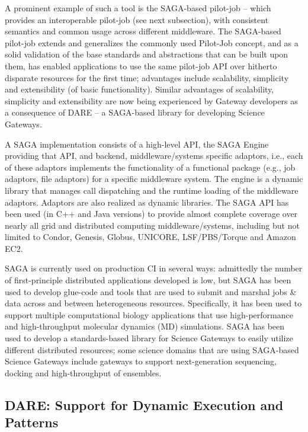 \documentclass[]{svjour3}
\begin{document}
A prominent example of such a tool is the SAGA-based pilot-job – which
provides an interoperable pilot-job (see next subsection), with
consistent semantics and common usage across different middleware. The
SAGA-based pilot-job extends and generalizes the commonly used
Pilot-Job concept, and as a solid validation of the base standards and
abstractions that can be built upon them, has enabled applications to
use the same pilot-job API over hitherto disparate resources for the
first time; advantages include scalability, simplicity and
extensibility (of basic functionality). Similar advantages of
scalability, simplicity and extensibility are now being experienced by
Gateway developers as a consequence of DARE – a SAGA-based library for
developing Science Gateways.

A SAGA implementation consists of a high-level API, the SAGA
Engine providing that API, and backend, middleware/systems specific
adaptors, i.e., each of these adaptors implements the functionality of
a functional package (e.g., job adaptors, file adaptors) for a
specific middleware system. The engine is a dynamic library that
manages call dispatching and the runtime loading of the middleware
adaptors. Adaptors are also realized as dynamic libraries. The SAGA
API has been used (in C++ and Java versions) to provide almost
complete coverage over nearly all grid and distributed computing
middleware/systems, including but not limited to Condor, Genesis,
Globus, UNICORE, LSF/PBS/Torque and Amazon EC2.

SAGA is currently used on production CI in several ways: admittedly
the number of first-principle distributed applications developed is
low, but SAGA has been used to develop glue-code and tools that are
used to submit and marshal jobs \& data across and between
heterogeneous resources. Specifically, it has been used to support
multiple computational biology applications that use high-performance
and high-throughput molecular dynamics (MD) simulations. SAGA has been
used to develop a standards-based library for Science Gateways to
easily utilize different distributed resources; some science domains
that are using SAGA-based Science Gateways include gateways to support
next-generation sequencing, docking and high-throughput of ensembles.

\subsection{DARE: Support for Dynamic Execution and Patterns}
\end{document}
